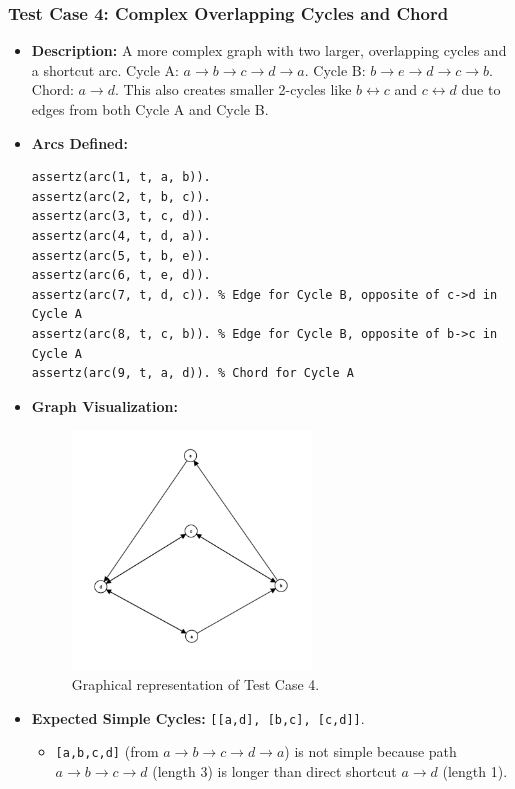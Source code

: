 \documentclass[12pt,a4paper]{article}
\begin{document}
\subsubsection{Test Case 4: Complex Overlapping Cycles and Chord}
\begin{itemize}
\item \textbf{Description:} A more complex graph with two larger, overlapping cycles and a shortcut arc.
Cycle A: $a \rightarrow b \rightarrow c \rightarrow d \rightarrow a$. 
Cycle B: $b \rightarrow e \rightarrow d \rightarrow c \rightarrow b$. 
Chord: $a \rightarrow d$. 
This also creates smaller 2-cycles like $b \leftrightarrow c$ and $c \leftrightarrow d$ due to edges from both Cycle A and Cycle B. 
\item \textbf{Arcs Defined:}
\begin{lstlisting}[style=prologstyle, basicstyle=\ttfamily\footnotesize]
assertz(arc(1, t, a, b)).
assertz(arc(2, t, b, c)).
assertz(arc(3, t, c, d)).
assertz(arc(4, t, d, a)).
assertz(arc(5, t, b, e)).
assertz(arc(6, t, e, d)).
assertz(arc(7, t, d, c)). % Edge for Cycle B, opposite of c->d in Cycle A
assertz(arc(8, t, c, b)). % Edge for Cycle B, opposite of b->c in Cycle A
assertz(arc(9, t, a, d)). % Chord for Cycle A
\end{lstlisting}
\item \textbf{Graph Visualization:}
\begin{figure}[H]
\centering
\includegraphics[width=0.6\textwidth]{Test4.png} %
\caption{Graphical representation of Test Case 4.}
\label{fig:testcase4}
\end{figure}
\item \textbf{Expected Simple Cycles:} \texttt{[[a,d], [b,c], [c,d]]}.
\begin{itemize}
\item \texttt{[a,b,c,d]} (from $a \rightarrow b \rightarrow c \rightarrow d \rightarrow a$) is not simple because path $a \rightarrow b \rightarrow c \rightarrow d$ (length 3) is longer than direct shortcut $a \rightarrow d$ (length 1). 

\end{itemize}
\end{itemize}
\end{document}
